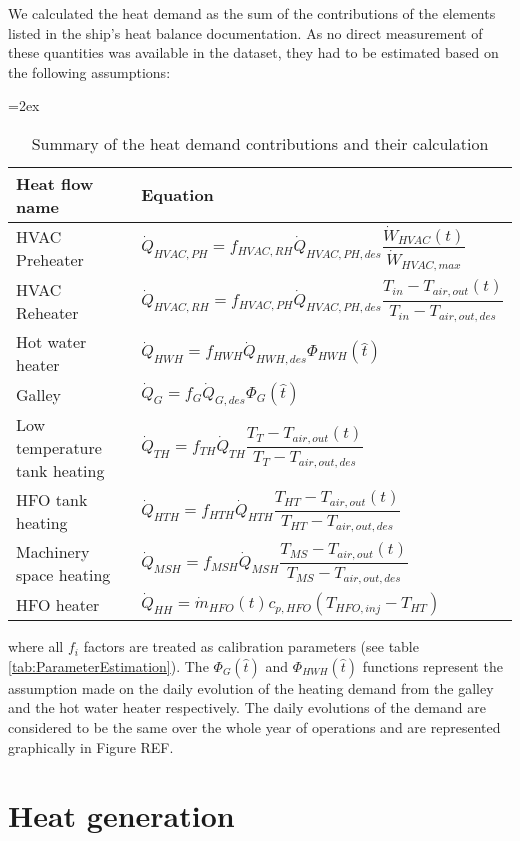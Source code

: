 \documentclass[]{article}
\begin{document}
We calculated the heat demand as the sum of the contributions of the elements listed in the ship's heat balance documentation. As no direct measurement of these quantities was available in the dataset, they had to be estimated based on the following assumptions:
\begin{table}
	\centering
	{\tablinesep=2ex\tabcolsep=10pt
	\begin{tabular}{p{2.8cm}l}
		\hline 
		Heat flow name & Equation \\
		\hline
		HVAC Preheater & $\dot{Q}_{HVAC,PH} = f_{HVAC,RH} \dot{Q}_{HVAC,PH,des} \dfrac{\dot{W}_{HVAC}(t)}{\dot{W}_{HVAC,max}} $ \\
		HVAC Reheater &	$\dot{Q}_{HVAC,RH} = f_{HVAC,PH} \dot{Q}_{HVAC,PH,des} \dfrac{T_{in} - T_{air,out}(t)}{T_{in} - T_{air,out,des}}$ \\
		Hot water heater& $\dot{Q}_{HWH} = f_{HWH} \dot{Q}_{HWH,des} \Phi_{HWH}(\hat{t})$ \\
		Galley & $\dot{Q}_{G} = f_{G} \dot{Q}_{G,des} \Phi_G(\hat{t})$ \\
		Low temperature tank heating & $\dot{Q}_{TH} = f_{TH} \dot{Q}_{TH} \dfrac{T_{T} - T_{air,out}(t)}{T_{T} -T_{air,out,des}}$ \\
		HFO tank heating & $\dot{Q}_{HTH} = f_{HTH} \dot{Q}_{HTH} \dfrac{T_{HT} - T_{air,out}(t)}{T_{HT} - T_{air,out,des}}$ \\
		Machinery space heating & $\dot{Q}_{MSH} = f_{MSH} \dot{Q}_{MSH} \dfrac{T_{MS} - T_{air,out}(t)}{T_{MS} - T_{air,out,des}}$ \\
		HFO heater & $\dot{Q}_{HH} = \dot{m}_{HFO}(t) c_{p,HFO} (T_{HFO,inj} - T_{HT})$ \\
		\hline
	\end{tabular}}
	\caption{Summary of the heat demand contributions and their calculation}
	\label{tab:HeatDemand}
\end{table}

where all $f_i$ factors are treated as calibration parameters (see table \ref{tab:ParameterEstimation}). The $\Phi_G(\hat{t})$ and $\Phi_{HWH}(\hat{t})$ functions represent the assumption made on the daily evolution of the heating demand from the galley and the hot water heater respectively. The daily evolutions of the demand are considered to be the same over the whole year of operations and are represented graphically in Figure REF.



\section{Heat generation}
\end{document}
